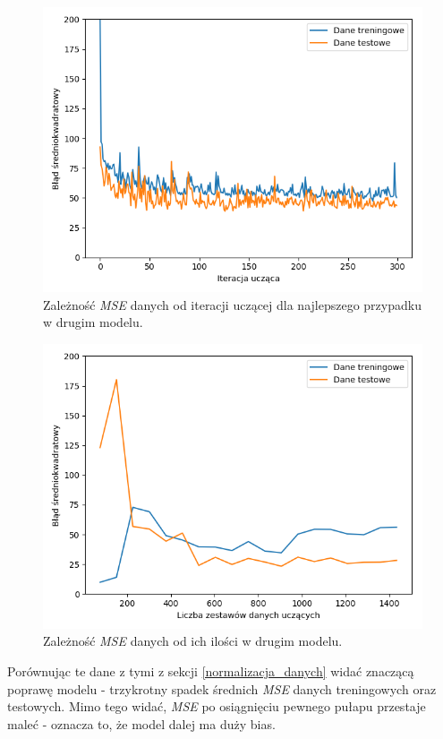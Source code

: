 \documentclass[12pt]{aghdpl}
\newenvironment{tightcenter}{
  \setlength\topsep{0pt}
  \setlength\parskip{0pt}
  \begin{center}
}{
  \end{center}
}
\begin{document}
		\begin{figure}[h]
			\begin{tightcenter}
	 			\includegraphics[width = 0.75\linewidth]{wykresy/3_drugi_model_tworzenie_i_analiza/wykres_uczenia.png}
	 		\end{tightcenter}
	 		
 			\caption{Zależność \textit{MSE} danych od iteracji uczącej dla najlepszego przypadku w drugim modelu.}
			\label{fig: drugi_model_wykres_uczenia}
		\end{figure}
		
		\begin{figure}[h]
			\begin{tightcenter}
	 			\includegraphics[width = 0.75\linewidth]{wykresy/3_drugi_model_tworzenie_i_analiza/learning_curves.png}
	 		\end{tightcenter}
	 		
 			\caption{Zależność \textit{MSE} danych od ich ilości w drugim modelu.}
			\label{fig: drugi_model_learning_curves}
		\end{figure}
		
		Porównując te dane z tymi z sekcji \ref{normalizacja_danych} widać znaczącą poprawę modelu - trzykrotny spadek średnich \textit{MSE} danych treningowych oraz testowych. Mimo tego widać, \textit{MSE} po osiągnięciu pewnego pułapu przestaje maleć - oznacza to, że model dalej ma duży bias.
		
\end{document}
